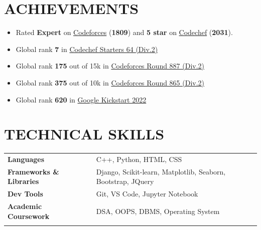 \documentclass[12pt]{article}
\begin{document}
\section*{ACHIEVEMENTS}
\begin{itemize}[leftmargin=20pt, topsep=0.7pt, itemsep=0.7pt, partopsep=0.7pt, parsep=0.7pt]
	\item Rated \textbf{Expert} on \href{https://codeforces.com/profile/prabhavagrawal7}{Codeforces} (\textbf{1809}) and \textbf{5 star} on \href{https://www.codechef.com/users/prabhav7}{Codechef} (\textbf{2031}).
	\item Global rank \textbf{7} in \href{https://www.codechef.com/rankings/START64B?search=prabhav7}{Codechef Starters 64 (Div.2)}
	\item Global rank \textbf{175} out of 15k in \href{https://codeforces.com/contest/1853/standings/participant/159682595#p159682595}{Codeforces Round 887 (Div.2)}
	\item Global rank \textbf{375} out of 10k in \href{https://codeforces.com/contest/1816/standings/participant/153555638#p153555638}{Codeforces Round 865 (Div.2)}
	\item Global rank \textbf{620} in \href{https://codingcompetitions.withgoogle.com/kickstart/certificate/summary/00000000008caba4}{Google Kickstart 2022}
\end{itemize}

\section*{TECHNICAL SKILLS}
\vspace{-2.5pt}
{\small
	\begin{tabular}{@{}llll}
		\textbf{Languages}               &   & C++, Python, HTML, CSS                                       \\
		\textbf{Frameworks \& Libraries} &   & Django, Scikit-learn, Matplotlib, Seaborn, Bootstrap, JQuery \\
		\textbf{Dev Tools}               &   & Git, VS Code, Jupyter Notebook                               \\
		\textbf{Academic Coursework}     &   & DSA, OOPS, DBMS, Operating System                            \\
		\vspace{-\topsep}
	\end{tabular}
}
\end{document}
